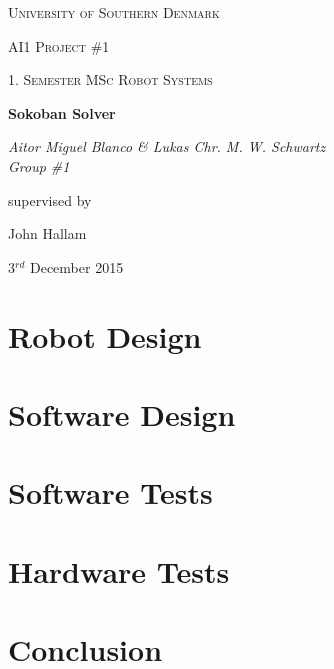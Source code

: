 \documentclass[12pt,a4paper]{article}
\begin{document}
\begin{titlepage}
	\centering
	\vfill
	{\scshape\LARGE University of Southern Denmark\par}
	\vspace{1cm}
	{\scshape\Large AI1 Project \#1\par}
	{\scshape\large 1. Semester MSc Robot Systems\par}
	\vspace{1.5cm}
	{\huge\bfseries Sokoban Solver\par}
	\vspace{2cm}
	{\Large\itshape Aitor Miguel Blanco \& Lukas Chr. M. W. Schwartz \\ Group \#1 \par}
	\vfill
	supervised by\par
	John Hallam

	\vspace{2cm}

	{\large 3$^{rd}$ December 2015 \par}
\end{titlepage}

\pagebreak

\tableofcontents

\pagebreak

\listoffigures

\listoftables

\pagebreak



\pagebreak
\section{Robot Design}






\pagebreak
\section{Software Design}








\pagebreak
\section{Software Tests}


\pagebreak
\section{Hardware Tests}


\pagebreak
\section{Conclusion}

\end{document}
